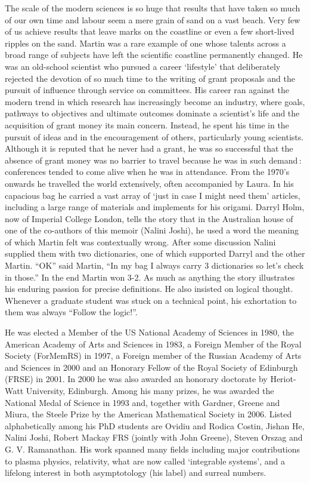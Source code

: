\documentclass[11pt]{article}
\begin{document}
The scale of the modern sciences is so huge that results that have taken so much of our own time and labour seem a mere grain of sand on a vast beach. Very few of us achieve results that leave marks on the coastline or even a few short-lived ripples on the sand. Martin was a rare example of one whose talents across a broad range of subjects have left the scientific coastline permanently changed. He was an old-school scientist who pursued a career `lifestyle' that deliberately rejected the devotion of so much time to the writing of grant proposals and the pursuit of influence through service on committees. His career ran against the modern trend in which research has increasingly become an industry, where goals, pathways to objectives and ultimate outcomes dominate a scientist's life and the acquisition of grant money its main concern. Instead, he spent his time in the pursuit of ideas and in the encouragement of others, particularly young scientists. Although it is reputed that he never had a grant, he was so successful that the absence of grant money was no barrier to travel because he was in such demand\,: conferences tended to come alive when he was in attendance. From the 1970's onwards he travelled the world extensively, often accompanied by Laura. In his capacious bag he carried a vast array of `just in case I might need them' articles, including a large range of materials and implements for his origami. Darryl Holm, now of Imperial College London, tells the story that in the Australian house of one of the co-authors of this memoir (Nalini Joshi), he used a word the meaning of which Martin felt was contextually wrong. After some discussion Nalini supplied them with two dictionaries, one of which supported Darryl and the other Martin. ``OK'' said Martin, ``In my bag I always carry 3 dictionaries so let's check in those.'' In the end Martin won 3-2. As much as anything the story illustrates his enduring passion for precise definitions. He also insisted on logical thought. Whenever a graduate student was stuck on a technical point, his exhortation to them was always ``Follow the logic!''. 
\par\smallskip%
He was elected a Member of the US National Academy of Sciences in 1980, the American Academy of Arts and Sciences in 1983, a Foreign Member of the Royal Society (ForMemRS) in 1997, a Foreign member of the Russian Academy of Arts and Sciences in 2000 
and an Honorary Fellow of the Royal Society of Edinburgh (FRSE) in 2001. In 2000 he was also awarded an honorary doctorate by Heriot-Watt University, Edinburgh. Among his many prizes, he was awarded the National Medal of Science in 1993 and, together with Gardner, Greene and Miura, the Steele Prize by the American Mathematical Society in 2006. Listed alphabetically among his PhD students are Ovidiu and Rodica Costin, Jishan He, Nalini Joshi, Robert Mackay FRS (jointly with John Greene), Steven Orszag and G. V. Ramanathan. His work spanned many fields including major contributions to plasma physics, relativity, what are now called `integrable systems', and a lifelong interest in both asymptotology (his label) and surreal numbers. 
\end{document}
